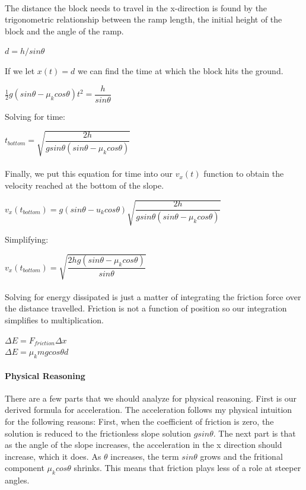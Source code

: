 \documentclass[11pt,a4paper]{report}
\begin{document}
\paragraph{}The distance the block needs to travel in the x-direction is found by the trigonometric relationship between the ramp length, the initial height of the block and the angle of the ramp.
\begin{center}
$d = h/sin\theta$
\end{center}
If we let $x(t) = d$ we can find the time at which the block hits the ground.
\begin{center}
$\frac{1}{2}g(sin\theta - \mu_kcos\theta)t^2 = \dfrac{h}{sin\theta}$ \end{center}
Solving for time:
\begin{center}
$t_{bottom} = \sqrt{\dfrac{2h}{gsin\theta(sin\theta - \mu_kcos\theta)}}$
\end{center}
\paragraph{}Finally, we put this equation for time into our $v_x(t)$ function to obtain the velocity reached at the bottom of the slope.
\begin{center}
$v_x(t_{bottom}) = g(sin\theta - u_kcos\theta)\sqrt{\dfrac{2h}{gsin\theta(sin\theta - \mu_kcos\theta)}}$
\end{center}
Simplifying:
\begin{center}
$v_x(t_{bottom}) = \sqrt{\dfrac{2hg(sin\theta - \mu_kcos\theta)}{sin\theta}}$
\end{center}
\paragraph{}Solving for energy dissipated is just a matter of integrating the friction force over the distance travelled. Friction is not a function of position so our integration simplifies to multiplication.
\begin{center}
$\Delta E = F_{friction}\Delta x$ \\
$\Delta E = \mu_kmgcos\theta d$
\end{center}
\paragraph{Physical Reasoning}There are a few parts that we should analyze for physical reasoning. First is our derived formula for acceleration. The acceleration follows my physical intuition for the following reasons: First, when the coefficient of friction is zero, the solution is reduced to the frictionless slope solution $gsin\theta$. The next part is that as the angle of the slope increases, the acceleration in the x direction should increase, which it does. As $\theta$ increases, the term $sin\theta$ grows and the fritional component $\mu_kcos\theta$ shrinks. This means that friction plays less of a role at steeper angles. 
\end{document}
